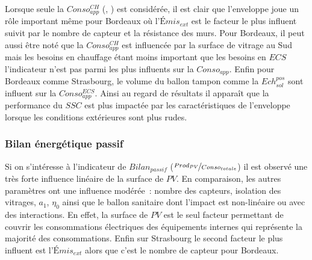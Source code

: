 Lorsque seule la $Conso_{app}^{CH}$ (, )
est considérée, il est clair que l’enveloppe joue un rôle important même pour Bordeaux où
l’$Émis_{ext}$ est le facteur le plus influent suivit par le nombre de capteur et la
résistance des murs. Pour Bordeaux, il peut aussi être noté que la $Conso_{app}^{CH}$ est
influencée par la surface de vitrage au Sud mais les besoins en chauffage étant moins
important que les besoins en $ECS$ l’indicateur n’est pas parmi les plus influents sur la
$Conso_{app}$. Enfin pour Bordeaux comme Strasbourg, le volume du ballon tampon comme la
$Ech_{sol}^{pos}$ sont influent sur la $Conso_{app}^{ECS}$. Ainsi au regard de résultats
il apparaît que la performance du $SSC$ est plus impactée par les caractéristiques de
l’enveloppe lorsque les conditions extérieures sont plus rudes.


\subsubsection{Bilan énergétique passif} %
\label{ssub:bilan_énergétique_passif}
Si on s’intéresse à l’indicateur de $Bilan_{passif}$ ($\nicefrac{Prod_{PV}}{Conso_{totale}}$)
il est observé une très forte influence linéaire de la surface de $PV$. En comparaison,
les autres paramètres ont une influence modérée~: nombre des capteurs, isolation des vitrages,
$a_{1}$, $\eta_{0}$ ainsi que le ballon sanitaire dont l’impact est non-linéaire ou avec des interactions.
En effet, la surface de $PV$ est le seul facteur permettant de couvrir les consommations
électriques des équipements internes qui représente la majorité des consommations. Enfin sur
Strasbourg le second facteur le plus influent est l’$Émis_{ext}$ alors que c’est le nombre
de capteur pour Bordeaux.


